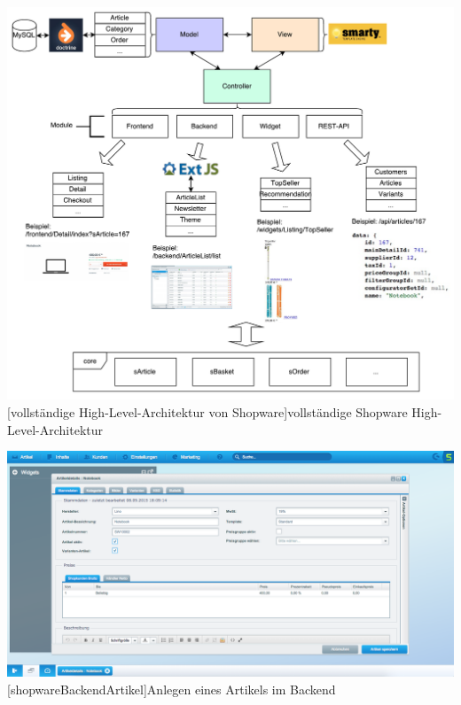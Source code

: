 \begin{appendix}
\vspace{1em}
\begin{minipage}{\linewidth}
	\centering
	\includegraphics[width=1\linewidth]{Abbildungen/shopwareMVC.pdf}
	[vollständige High-Level-Architektur von Shopware]{vollständige Shopware High-Level-Architektur}
	\label{fig:shopwareMVCLong}
\end{minipage}
\vspace{1em}

\vspace{1em}
\begin{minipage}{\linewidth}
	\centering
	\includegraphics[width=1\linewidth]{Abbildungen/shopwareBackendArtikel.png}
	[shopwareBackendArtikel]{Anlegen eines Artikels im Backend}
	\label{app:shopwareBackendArtikel}
\end{minipage}
\vspace{1em}


\end{appendix}
